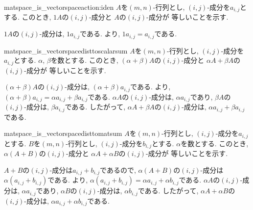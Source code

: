 \begin{proofof*}{matspace_is_vectorspace}{action:iden}
  $A$を$(m,n)$-行列とし, $(i,j)$-成分を$a_{i,j}$とする.
  このとき,
  $1A$の$(i,j)$-成分と
  $A$の$(i,j)$-成分が
  等しいことを示す.

  $1A$の$(i,j)$-成分は, $1a_{i,j}$である.
  より,
  $1a_{i,j}=a_{i,j}$である.
\end{proofof*}

\begin{proofof*}{matspace_is_vectorspace}{disttoscalarsum}
  $A$を$(m,n)$-行列とし, $(i,j)$-成分を$a_{i,j}$とする.
  $\alpha$, $\beta$を数とする.
  このとき,
  $(\alpha+\beta)A$の$(i,j)$-成分と
  $\alpha A+ \beta A$の$(i,j)$-成分が
  等しいことを示す.
  

  $(\alpha+\beta)A$の$(i,j)$-成分は, $(\alpha+\beta)a_{i,j}$である.
  より,
  $(\alpha+\beta)a_{i,j}=\alpha a_{i,j}+\beta a_{i,j}$である.
  $\alpha A$の$(i,j)$-成分は, $\alpha a_{i,j}$であり,
  $\beta A$の$(i,j)$-成分は, $\beta a_{i,j}$である.
  したがって,
  $\alpha A+\beta A$の$(i,j)$-成分は, $\alpha a_{i,j}+\beta a_{i,j}$である.
\end{proofof*}

\begin{proofof*}{matspace_is_vectorspace}{disttomatsum}
  $A$を$(m,n)$-行列とし, $(i,j)$-成分を$a_{i,j}$とする.
  $B$を$(m,n)$-行列とし, $(i,j)$-成分を$b_{i,j}$とする.
  $\alpha$を数とする.
  このとき,
  $\alpha(A+B)$の$(i,j)$-成分と
  $\alpha A+ \alpha B$の$(i,j)$-成分が
  等しいことを示す.
  

  $A+B$の$(i,j)$-成分は$a_{i,j}+b_{i,j}$であるので,
  $\alpha(A+B)$の$(i,j)$-成分は$\alpha(a_{i,j}+b_{i,j})$である.
  より,
  $\alpha(a_{i,j}+b_{i,j})=\alpha a_{i,j}+ \alpha b_{i,j}$である.
  $\alpha A$の$(i,j)$-成分は, $\alpha a_{i,j}$であり,
  $\alpha B$の$(i,j)$-成分は, $\alpha b_{i,j}$である.
  したがって,
  $\alpha A+\alpha B$の$(i,j)$-成分は, $\alpha a_{i,j}+\alpha b_{i,j}$である.
\end{proofof*}

